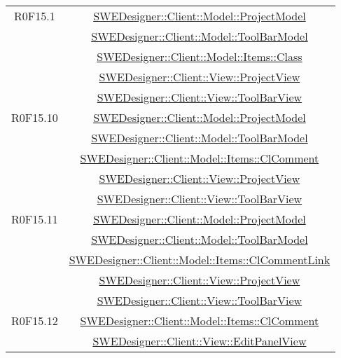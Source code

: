 \documentclass[../DefinizioneDiProdotto.tex]{subfiles}
\begin{document}
\begin{longtable}{|c|c|}
				R0F15.1
				& \hyperlink{SWEDesigner::Client::Model::ProjectModel}{SWEDesigner::Client::Model::ProjectModel}\\
				& \hyperlink{SWEDesigner::Client::Model::ToolBarModel}{SWEDesigner::Client::Model::ToolBarModel}\\
				& \hyperlink{SWEDesigner::Client::Model::Items::Class}{SWEDesigner::Client::Model::Items::Class}\\
				& \hyperlink{SWEDesigner::Client::View::ProjectView}{SWEDesigner::Client::View::ProjectView}\\
				& \hyperlink{SWEDesigner::Client::View::ToolBarView}{SWEDesigner::Client::View::ToolBarView}\\
				\hline

				R0F15.10
				& \hyperlink{SWEDesigner::Client::Model::ProjectModel}{SWEDesigner::Client::Model::ProjectModel}\\
				& \hyperlink{SWEDesigner::Client::Model::ToolBarModel}{SWEDesigner::Client::Model::ToolBarModel}\\
				& \hyperlink{SWEDesigner::Client::Model::Items::ClComment}{SWEDesigner::Client::Model::Items::ClComment}\\
				& \hyperlink{SWEDesigner::Client::View::ProjectView}{SWEDesigner::Client::View::ProjectView}\\
				& \hyperlink{SWEDesigner::Client::View::ToolBarView}{SWEDesigner::Client::View::ToolBarView}\\
				\hline

				R0F15.11
				& \hyperlink{SWEDesigner::Client::Model::ProjectModel}{SWEDesigner::Client::Model::ProjectModel}\\
				& \hyperlink{SWEDesigner::Client::Model::ToolBarModel}{SWEDesigner::Client::Model::ToolBarModel}\\
				& \hyperlink{SWEDesigner::Client::Model::Items::ClCommentLink}{SWEDesigner::Client::Model::Items::ClCommentLink}\\
				& \hyperlink{SWEDesigner::Client::View::ProjectView}{SWEDesigner::Client::View::ProjectView}\\
				& \hyperlink{SWEDesigner::Client::View::ToolBarView}{SWEDesigner::Client::View::ToolBarView}\\
				\hline

				R0F15.12
				& \hyperlink{SWEDesigner::Client::Model::Items::ClComment}{SWEDesigner::Client::Model::Items::ClComment}\\
				& \hyperlink{SWEDesigner::Client::View::EditPanelView}{SWEDesigner::Client::View::EditPanelView}\\
				\hline


\end{longtable}
\end{document}
